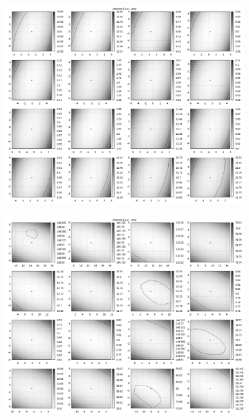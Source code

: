 \begin{figure}[!h]
\begin{subfigure}[t]{0.4\textwidth}
	 \end{subfigure}
\\
\vspace{5mm}
     \begin{subfigure}[t]{0.4\textwidth}
			\centering
			\includegraphics[width=\textwidth]{img/fitness/xz_a0zoomed.png}
	 \end{subfigure}
	 \qquad
     \begin{subfigure}[t]{0.4\textwidth}
			\centering
			\includegraphics[width=\textwidth]{img/fitness/yz_a0zoomed.png}
	 \end{subfigure}      
\end{figure}
